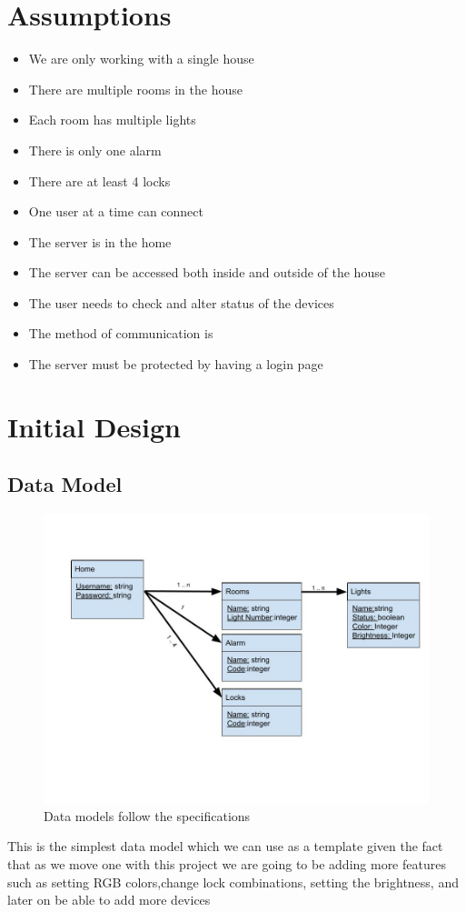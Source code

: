\documentclass[11pt]{article}
\begin{document}
	\section{Assumptions}
		\begin{itemize}
			\item We are only working with a single house
			\item There are multiple rooms in the house
			\item Each room has multiple lights
			\item There is only one alarm
			\item There are at least 4 locks
			\item One user at a time can connect
			\item The server is in the home
			\item The server can be accessed both inside and outside of the house
			\item The user needs to check and alter status of the devices
			\item The method of communication is
			\item The server must be protected by having a login page
		\end{itemize}
	\section{Initial Design}
		\subsection*{Data Model}
			\begin{figure}[H]
				\centering
				\includegraphics[scale=0.5]{data_model}
				\caption{Data models follow the specifications}
				\label{fig:datamodel}
			\end{figure}
		This is the simplest data model which we can use as a template given the fact that as we move one with this project we are going to be adding more features such as setting RGB colors,change lock combinations, setting the brightness, and later on be able to add more devices
\end{document}

